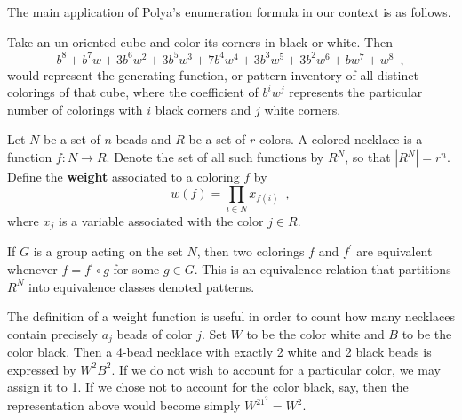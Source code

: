 The main application of Polya's enumeration formula in our context is as follows.

\begin{example} \cite{Tucker1974} Take an un-oriented cube and color its corners in black or white. Then
$$
b^8 + b^7w + 3b^6w^2 + 3b^5w^3 + 7b^4w^4 + 3b^3w^5 + 3b^2w^6 + bw^7 + w^8 \enspace,
$$
would represent the generating function, or pattern inventory of all distinct colorings of that cube, where the coefficient of $b^iw^j$ represents the particular number of colorings with $i$ black corners and $j$ white corners.
\end{example}

\begin{definition} Let $N$ be a set of $n$ beads and $R$ be a set of $r$ colors. A colored necklace is a function $f : N \to R$. Denote the set of all such functions by $R^N$, so that $|R^N| = r^n$. Define the \textbf{weight} associated to a coloring $f$ by
$$
w(f) = \prod_{i \in N} x_{f(i)} \enspace,
$$
where $x_j$ is a variable associated with the color $j \in R$.
\end{definition}

\begin{proposition} If $G$ is a group acting on the set $N$, then two colorings $f$ and $f^\prime$ are equivalent whenever $f = f^\prime \circ g$ for some $g \in G$. This is an equivalence relation that partitions $R^N$ into equivalence classes denoted patterns.
\end{proposition}











\begin{example} The definition of a weight function is useful in order to count how many necklaces contain precisely $a_j$ beads of color $j$. Set $W$ to be the color white and $B$ to be the color black. Then a 4-bead necklace with exactly 2 white and 2 black beads is expressed by $W^2B^2$. If we do not wish to account for a particular color, we may assign it to 1. If we chose not to account for the color black, say, then the representation above would become simply $W^21^2 = W^2$.
\end{example}






